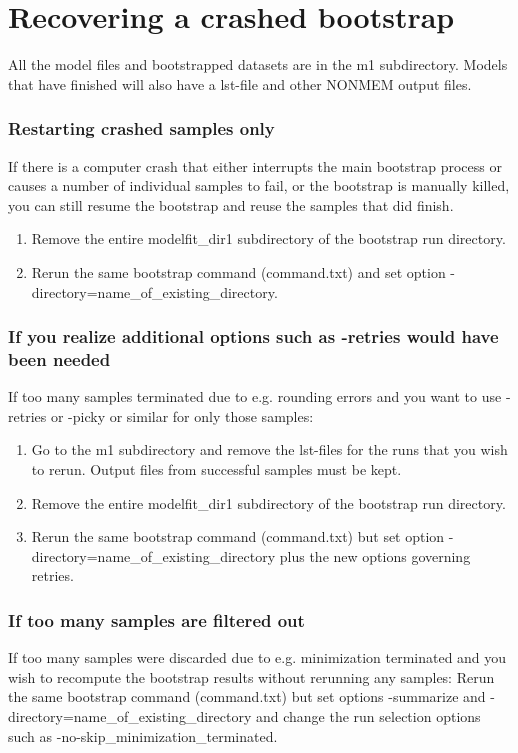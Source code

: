 \section{Recovering a crashed bootstrap}

All the model files and bootstrapped datasets are in the m1 subdirectory. Models that have finished will also have a 
lst-file and other NONMEM output files.  
\subsubsection*{Restarting crashed samples only}
If there is a computer crash that either interrupts the main bootstrap process or causes a number of individual samples to fail, or the bootstrap is manually killed, you can still resume the bootstrap and reuse the samples that did finish.
\begin{enumerate}
    \item Remove the entire modelfit\_dir1 subdirectory of the bootstrap run directory.
	\item Rerun the same bootstrap command (command.txt) and set option -directory=name\_of\_existing\_directory. 
\end{enumerate}

\subsubsection*{If you realize additional options such as -retries would have been needed}
If too many samples terminated due to e.g. rounding errors and you want to use -retries or -picky or similar for only those samples:
\begin{enumerate}
	\item Go to the m1 subdirectory and remove the lst-files for the runs that you wish to rerun. Output files from successful samples must be kept.
    \item Remove the entire modelfit\_dir1 subdirectory of the bootstrap run directory.
	\item Rerun the same bootstrap command 
(command.txt) but set option -directory=name\_of\_existing\_directory 
plus the new options governing retries.
\end{enumerate}

\subsubsection*{If too many samples are filtered out}
If too many samples were discarded due to e.g. minimization terminated and you wish to recompute the bootstrap results without rerunning any samples: 
Rerun the same bootstrap command (command.txt) but set options -summarize
and -directory=name\_of\_existing\_directory and change the
run selection options such as -no-skip\_minimization\_terminated. 

